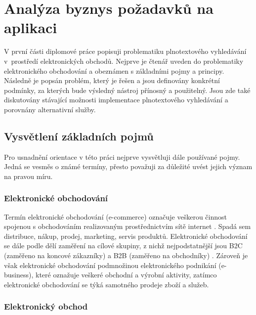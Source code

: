 \documentclass[FM,DP]{tulthesis}
\begin{document}


\chapter{Analýza byznys požadavků na aplikaci}

V první části diplomové práce popisuji problematiku plnotextového vyhledávání 
v~prostředí elektronických obchodů. Nejprve je čtenář uveden do problematiky elektronického
obchodování a obeznámen s základními pojmy a principy. Následně je popsán problém, 
který je řešen a jsou definovány konkrétní podmínky, za kterých bude výsledný nástroj
přínosný a použitelný. Jsou zde také diskutovány stávající možnosti implementace
plnotextového vyhledávání a porovnány alternativní služby.

\section{Vysvětlení základních pojmů}

Pro usnadnění orientace v této práci nejprve vysvětluji dále používané pojmy. Jedná se 
vesměs o známé termíny, přesto považuji za důležité uvést jejich význam na pravou míru.

\subsection*{Elektronické obchodování}

Termín elektronické obchodování (e-commerce) označuje veškerou činnost spojenou s obchodováním
realizovaným prostřednictvím sítě internet \cite[strana~11]{e-commerce}. Spadá sem distribuce, nákup, 
prodej, marketing, servis produktů. Elektronické obchodování se dále podle dělí zaměření na cílové 
skupiny, z nichž nejpodstatnější jsou B2C (zaměřeno na koncové zákazníky) a B2B (zaměřeno na obchodníky) 
\cite[strana~17]{e-commerce}. Zároveň je však elektronické obchodování podmnožinou 
elektronického podnikání (e-business), které oznažuje veškeré obchodní a výrobní aktivity, 
zatímco elektronické obchodování se týká samotného prodeje zboží a služeb.

\subsection*{Elektronický obchod}
\end{document}
